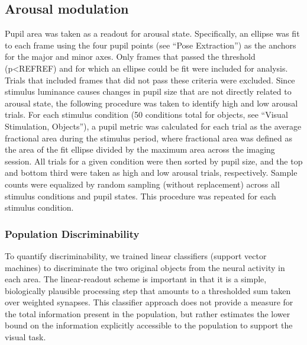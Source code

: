 \subsection{Arousal modulation}
Pupil area was taken as a readout for arousal state. Specifically, an ellipse was fit to each frame using the four pupil points (see ``Pose Extraction'') as the anchors for the major and minor axes. Only frames that passed the threshold (p<REFREF) and for which an ellipse could be fit were included for analysis. Trials that included frames that did not pass these criteria were excluded. Since stimulus luminance causes changes in pupil size that are not directly related to arousal state, the following procedure was taken to identify high and low arousal trials. For each stimulus condition (50 conditions total for objects, see ``Visual Stimulation, Objects''), a pupil metric was calculated for each trial as the average fractional area during the stimulus period, where fractional area was defined as the area of the fit ellipse divided by the maximum area across the imaging session. All trials for a given condition were then sorted by pupil size, and the top and bottom third were taken as high and low arousal trials, respectively. Sample counts were equalized by random sampling (without replacement) across all stimulus conditions and pupil states. This procedure was repeated for each stimulus condition. 

\subsubsection{Population Discriminability}
To quantify discriminability, we trained linear classifiers (support vector machines) to discriminate the two original objects from the neural activity in each area. The linear-readout scheme is important in that it is a simple, biologically plausible processing step that amounts to a thresholded sum taken over weighted synapses. This classifier approach does not provide a measure for the total information present in the population, but rather estimates the lower bound on the information explicitly accessible to the population to support the visual task\cite{Hung2005, Rust2010SelectivityIT}.

